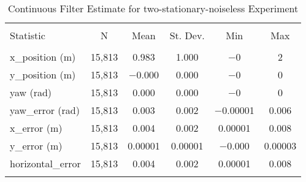 
\begin{table}[h] \centering 
  \caption{Continuous Filter Estimate for two-stationary-noiseless Experiment} 
  \label{tab:two_stationary_noiseless_continuous_summary} 
\begin{tabular}{@{\extracolsep{5pt}}lccccc} 
\\[-1.8ex]\hline 
\hline \\[-1.8ex] 
Statistic & \multicolumn{1}{c}{N} & \multicolumn{1}{c}{Mean} & \multicolumn{1}{c}{St. Dev.} & \multicolumn{1}{c}{Min} & \multicolumn{1}{c}{Max} \\ 
\hline \\[-1.8ex] 
x\_position (m) & 15,813 & \num{0.983} & \num{1.000} & $-$0 & 2 \\ 
y\_position (m) & 15,813 & \num{-0.000} & \num{0.000} & $-$0 & 0 \\ 
yaw (rad) & 15,813 & \num{0.000} & \num{0.000} & $-$0 & 0 \\ 
yaw\_error (rad) & 15,813 & \num{0.003} & \num{0.002} & \num{-0.00001} & \num{0.006} \\ 
x\_error (m) & 15,813 & \num{0.004} & \num{0.002} & \num{0.00001} & \num{0.008} \\ 
y\_error (m) & 15,813 & \num{0.00001} & \num{0.00001} & \num{-0.000} & \num{0.00003} \\ 
horizontal\_error & 15,813 & \num{0.004} & \num{0.002} & \num{0.00001} & \num{0.008} \\ 
\hline \\[-1.8ex] 
\end{tabular} 
\end{table} 

